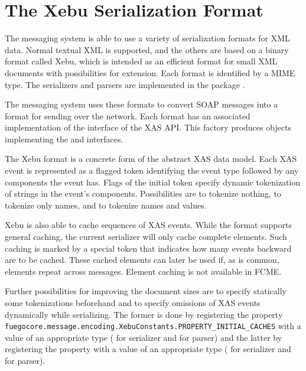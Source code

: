 \documentclass[draft]{article}
\begin{document}
\section{The Xebu Serialization Format}
\label{sec:xebu-format}

The messaging system is able to use a variety of serialization formats
for XML data.  Normal textual XML is supported, and the others are
based on a binary format called Xebu, which is intended as an
efficient format for small XML documents with possibilities for
extension.  Each format is identified by a MIME type.  The serializers
and parsers are implemented in the package
.

The messaging system uses these formats to convert SOAP messages into
a format for sending over the network.  Each format has an associated
implementation of the  interface of the XAS API.
This factory produces objects implementing the
 and  interfaces.

The Xebu format is a concrete form of the abstract XAS data model.
Each XAS event is represented as a flagged token identifying the event
type followed by any components the event has.  Flags of the initial
token specify dynamic tokenization of strings in the event's
components.  Possibilities are to tokenize nothing, to tokenize only
names, and to tokenize names and values.

Xebu is also able to cache sequences of XAS events.  While the format
supports general caching, the current serializer will only cache
complete elements.  Such caching is marked by a special token that
indicates how many events backward are to be cached.  These cached
elements can later be used if, as is common, elements repeat across
messages.  Element caching is not available in FCME.

Further possibilities for improving the document sizes are to specify
statically some tokenizations beforehand and to specify omissions of
XAS events dynamically while serializing.  The former is done by
registering the property
\texttt{fue\-go\-core.message.encoding.XebuConstants.PROPERTY\_INITIAL\_CACHES}
with a value of an appropriate type
( for serializer and
 for parser) and the latter by registering the
property
with a value of an appropriate type
( for serializer and
 for parser).
\end{document}
